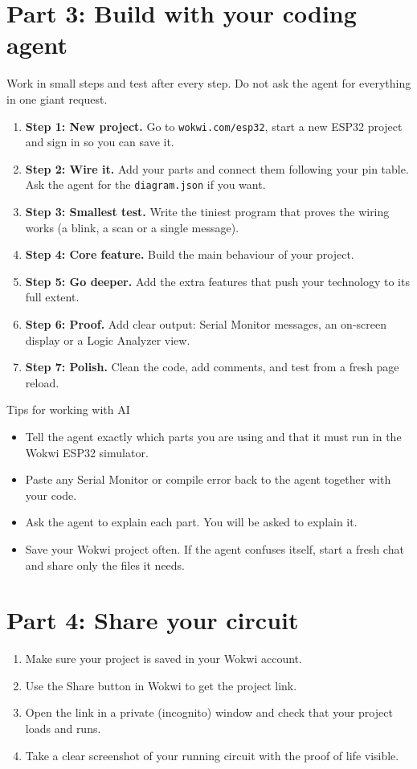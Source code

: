 \documentclass[11pt,a4paper]{article}
\begin{document}
\section*{Part 3: Build with your coding agent}
Work in small steps and test after every step. Do not ask the agent for everything in one giant request.
\begin{enumerate}
\item \textbf{Step 1: New project.} Go to \texttt{wokwi.com/esp32}, start a new ESP32 project and sign in so you can save it.
\item \textbf{Step 2: Wire it.} Add your parts and connect them following your pin table. Ask the agent for the \texttt{diagram.json} if you want.
\item \textbf{Step 3: Smallest test.} Write the tiniest program that proves the wiring works (a blink, a scan or a single message).
\item \textbf{Step 4: Core feature.} Build the main behaviour of your project.
\item \textbf{Step 5: Go deeper.} Add the extra features that push your technology to its full extent.
\item \textbf{Step 6: Proof.} Add clear output: Serial Monitor messages, an on-screen display or a Logic Analyzer view.
\item \textbf{Step 7: Polish.} Clean the code, add comments, and test from a fresh page reload.
\end{enumerate}

\begin{note}{Tips for working with AI}
\begin{itemize}
\item Tell the agent exactly which parts you are using and that it must run in the Wokwi ESP32 simulator.
\item Paste any Serial Monitor or compile error back to the agent together with your code.
\item Ask the agent to explain each part. You will be asked to explain it.
\item Save your Wokwi project often. If the agent confuses itself, start a fresh chat and share only the files it needs.
\end{itemize}
\end{note}

\section*{Part 4: Share your circuit}
\begin{enumerate}
\item Make sure your project is saved in your Wokwi account.
\item Use the Share button in Wokwi to get the project link.
\item Open the link in a private (incognito) window and check that your project loads and runs.
\item Take a clear screenshot of your running circuit with the proof of life visible.
\end{enumerate}
\end{document}
